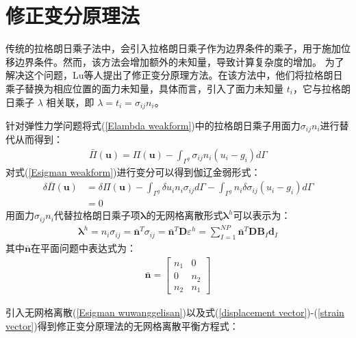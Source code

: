 \section{修正变分原理法}
传统的拉格朗日乘子法中，会引入拉格朗日乘子作为边界条件的乘子，用于施加位移边界条件。然而，该方法会增加额外的未知量，导致计算复杂度的增加。
为了解决这个问题，Lu等人\cite{}提出了修正变分原理方法。在该方法中，他们将拉格朗日乘子替换为相应位置的面力未知量，具体而言，引入了面力未知量 $t_i$，它与拉格朗日乘子 $\lambda$ 相关联，即 $\lambda = t_i = \sigma_{ij}n_i$。\par
针对弹性力学问题将式(\ref{Elambda weakform})中的拉格朗日乘子用面力$\sigma_{ij}n_i$进行替代从而得到：
\begin{equation}
\begin{split}\label{Esigman weakform}
    \bar{\Pi}(\pmb{u})=\Pi(\pmb{u})-\int_{\Gamma^g}\sigma_{ij}n_i(u_i-g_i)d\Gamma
\end{split}
\end{equation}
对式(\ref{Esigman weakform})进行变分可以得到伽辽金弱形式：
\begin{equation}
\begin{split}
    \delta\bar{\Pi}(\pmb{u})&=\delta\Pi(\pmb{u})-\int_{\Gamma^g}\delta u_in_i\sigma_{ij}d\Gamma-\int_{\Gamma^g}n_i\delta\sigma_{ij}(u_i-g_i)d\Gamma\\
    &=0
\end{split}
\end{equation}
用面力$\sigma_{ij}n_i$代替拉格朗日乘子项$\pmb{\lambda}$的无网格离散形式$\pmb{\lambda}^h$可以表示为：
\begin{equation}\label{Esigman wuwanggelisan}
\begin{split}
    \pmb{\lambda}^h=n_i\sigma_{ij}=\bar{\pmb n}^T\sigma_{ij}=\bar{\pmb n}^T\pmb{D}\varepsilon^h=\sum_{I=1}^{N\!P}\bar{\pmb n}^T\pmb{D}\pmb{B}_I\pmb{d}_I
\end{split}
\end{equation}
其中$\bar{\pmb{n}}$在平面问题中表达式为：
\begin{equation}
\begin{split}
    \bar{\pmb n}=\left[\begin{matrix}n_1&0\\0&n_2\\n_2&n_1
    \end{matrix}\right]
\end{split}
\end{equation}\par
引入无网格离散(\ref{Esigman wuwanggelisan})以及式(\ref{displacement vector})-(\ref{strain vector})得到修正变分原理法的无网格离散平衡方程式：
